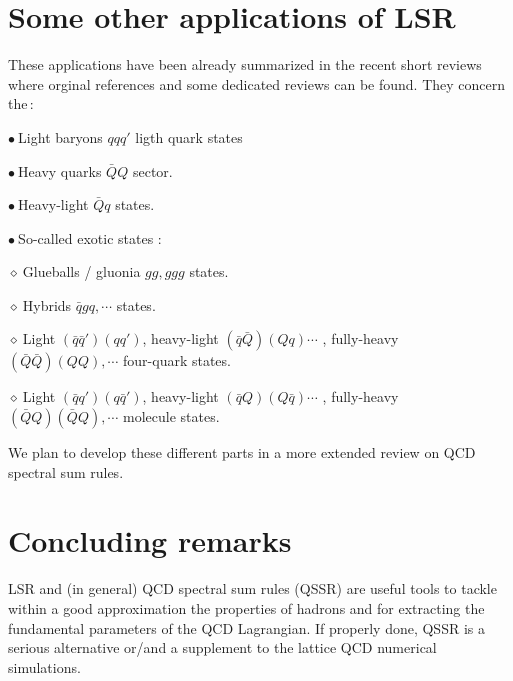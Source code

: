 \documentclass[aps,prd,groupedaddress,nofootinbib]{revtex4-1}
\def\b{$\bullet~$}
\def\d{$\diamond~$}
\begin{document}
\section{Some other applications of LSR}
These applications have been already summarized in the recent short reviews\,\cite{SNREV21,SNREV22} where  orginal references and some dedicated reviews can be found. They concern the\,:

\b Light baryons $qqq'$ ligth quark states 

\b Heavy quarks $\bar QQ$ sector.

\b Heavy-light $\bar Qq$ states.

\b So-called exotic states :

\hspace*{0.5cm} \d  Glueballs / gluonia $gg, ggg$ states.

\hspace*{0.5cm} \d  Hybrids $\bar q g q, \cdots$ states.

\hspace*{0.5cm} \d  Light $(\bar q\bar q') (qq')$, heavy-light  $(\bar q\bar Q) (Qq)\cdots$ , fully-heavy $(\bar Q\bar Q) (QQ),\cdots$ four-quark states.

\hspace*{0.5cm} \d  Light $(\bar q q') (q\bar q')$, heavy-light  $(\bar q Q) (Q\bar q)\cdots$ , fully-heavy $(\bar Q Q) (\bar QQ),\cdots$ molecule states.


We plan to develop these different parts in a more extended review on QCD spectral sum rules. 

\section*{Concluding remarks}
LSR and (in general) QCD spectral sum rules (QSSR) are useful tools to tackle within a good approximation the properties of hadrons and for extracting the fundamental  parameters of the QCD Lagrangian. If properly done, QSSR is a serious alternative or/and a supplement to the lattice QCD numerical simulations. 


\end{document}
